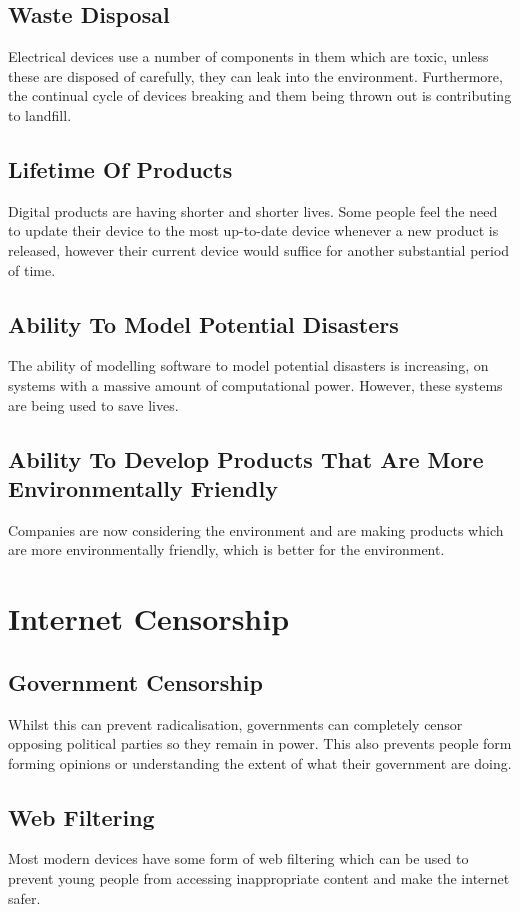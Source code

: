 \documentclass[a4paper,11pt, twocolumn]{article}
\begin{document}
\subsection{Waste Disposal}
Electrical devices use a number of components in them which are toxic, unless these are disposed of carefully, they can leak into the environment. Furthermore, the continual cycle of devices breaking and them being thrown out is contributing to landfill.
\subsection{Lifetime Of Products}
Digital products are having shorter and shorter lives. Some people feel the need to update their device to the most up-to-date device whenever a new product is released, however their current device would suffice for another substantial period of time.
\subsection{Ability To Model Potential Disasters}
The ability of modelling software to model potential disasters is increasing, on systems with a massive amount of computational power. However, these systems are being used to save lives.
\subsection{Ability To Develop Products That Are More Environmentally Friendly}
Companies are now considering the environment and are making products which are more environmentally friendly, which is better for the environment.

\section{Internet Censorship}
\subsection{Government Censorship}
Whilst this can prevent radicalisation, governments can completely censor opposing political parties so they remain in power. This also prevents people form forming opinions or understanding the extent of what their government are doing.
\subsection{Web Filtering}
Most modern devices have some form of web filtering which can be used to prevent young people from accessing inappropriate content and make the internet safer.
\end{document}
